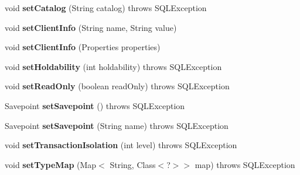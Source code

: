 \begin{DoxyCompactItemize}
void {\bfseries set\+Catalog} (String catalog)  throws S\+Q\+L\+Exception 
\item 
\mbox{\label{classsimpledb_1_1jdbc_1_1ConnectionAdapter_aecd091ae137d4195ee54e7d524218cbc}} 
void {\bfseries set\+Client\+Info} (String name, String value)
\item 
\mbox{\label{classsimpledb_1_1jdbc_1_1ConnectionAdapter_a034bbacdf107fec28340cb3be2501ef0}} 
void {\bfseries set\+Client\+Info} (Properties properties)
\item 
\mbox{\label{classsimpledb_1_1jdbc_1_1ConnectionAdapter_a013e185953b4e616444c6b629e6ec0e3}} 
void {\bfseries set\+Holdability} (int holdability)  throws S\+Q\+L\+Exception 
\item 
\mbox{\label{classsimpledb_1_1jdbc_1_1ConnectionAdapter_a89a06accd35a62bb33a6938674c9d2e8}} 
void {\bfseries set\+Read\+Only} (boolean read\+Only)  throws S\+Q\+L\+Exception 
\item 
\mbox{\label{classsimpledb_1_1jdbc_1_1ConnectionAdapter_ae98021b88296b8291bf14202770353a4}} 
Savepoint {\bfseries set\+Savepoint} ()  throws S\+Q\+L\+Exception 
\item 
\mbox{\label{classsimpledb_1_1jdbc_1_1ConnectionAdapter_a9bb766f97462255a9109510cd160d6fa}} 
Savepoint {\bfseries set\+Savepoint} (String name)  throws S\+Q\+L\+Exception 
\item 
\mbox{\label{classsimpledb_1_1jdbc_1_1ConnectionAdapter_a6247e9d47ffcfb31ac804361b2de527f}} 
void {\bfseries set\+Transaction\+Isolation} (int level)  throws S\+Q\+L\+Exception 
\item 
\mbox{\label{classsimpledb_1_1jdbc_1_1ConnectionAdapter_af71680614949aa06f836582f225cb017}} 
void {\bfseries set\+Type\+Map} (Map$<$ String, Class$<$?$>$$>$ map)  throws S\+Q\+L\+Exception 
\item 
\mbox{\label{classsimpledb_1_1jdbc_1_1ConnectionAdapter_a4ae0aab0f6e13abf97d218ef1b0a95b0}} 
$$
\end{DoxyCompactItemize}

